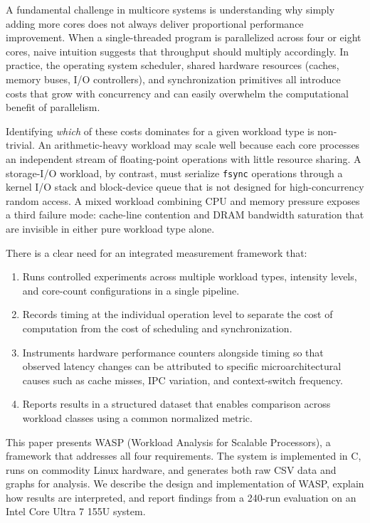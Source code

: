 \documentclass[conference]{IEEEtran}
\begin{document}
A fundamental challenge in multicore systems is understanding why simply
adding more cores does not always deliver proportional performance improvement.
When a single-threaded program is parallelized across four or eight cores,
naive intuition suggests that throughput should multiply accordingly.  In
practice, the operating system scheduler, shared hardware resources (caches,
memory buses, I/O controllers), and synchronization primitives all introduce
costs that grow with concurrency and can easily overwhelm the computational
benefit of parallelism.

Identifying \emph{which} of these costs dominates for a given workload type
is non-trivial.  An arithmetic-heavy workload may scale well because each
core processes an independent stream of floating-point operations with little
resource sharing.  A storage-I/O workload, by contrast, must serialize
\texttt{fsync} operations through a kernel I/O stack and block-device queue
that is not designed for high-concurrency random access.  A mixed workload
combining CPU and memory pressure exposes a third failure mode: cache-line
contention and DRAM bandwidth saturation that are invisible in either pure
workload type alone.

There is a clear need for an integrated measurement framework that:
\begin{enumerate}
  \item Runs controlled experiments across multiple workload types, intensity
        levels, and core-count configurations in a single pipeline.
  \item Records timing at the individual operation level to separate the cost
        of computation from the cost of scheduling and synchronization.
  \item Instruments hardware performance counters alongside timing so that
        observed latency changes can be attributed to specific microarchitectural
        causes such as cache misses, IPC variation, and context-switch frequency.
  \item Reports results in a structured dataset that enables comparison across
        workload classes using a common normalized metric.
\end{enumerate}

This paper presents WASP (Workload Analysis for Scalable Processors), a
framework that addresses all four requirements.  The system is implemented in
C, runs on commodity Linux hardware, and generates both raw CSV data and
graphs for analysis.  We describe the design and implementation of WASP,
explain how results are interpreted, and report findings from a 240-run
evaluation on an Intel Core Ultra 7 155U system.
\end{document}
